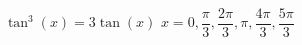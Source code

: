 { $\tan^{3} \left( x \right) = 3\tan \left( x \right)$}
{ $x = 0, \dfrac{\pi}{3}, \dfrac{2\pi}{3}, \pi, \dfrac{4\pi}{3}, \dfrac{5\pi}{3}$}
